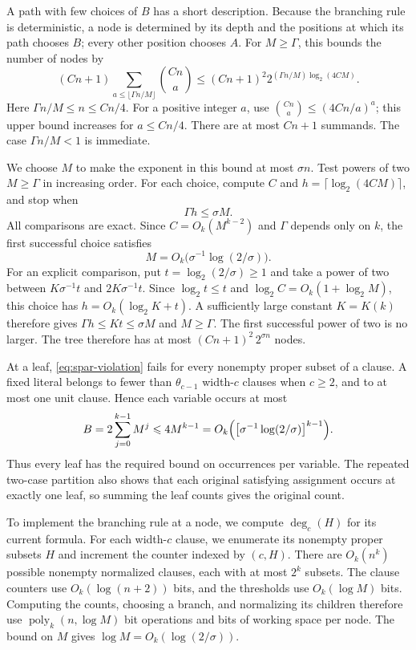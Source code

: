 \documentclass[11pt,reqno]{amsart}
\numberwithin{equation}{section}
\theoremstyle{definition}\newtheorem{definition}[theorem]{Definition}
\theoremstyle{remark}\newtheorem{remark}[theorem]{Remark}
\newcommand{\poly}{\operatorname{poly}}
\renewcommand{\le}{\leqslant}
\renewcommand{\ge}{\geqslant}
\begin{document}
A path with few choices of $B$ has a short description.
Because the branching rule is deterministic, a node is determined
by its depth and the positions at which its path chooses $B$;
every other position chooses $A$.
For $M\ge\Gamma$, this bounds the number of nodes by
\[
 (Cn+1)\sum_{a\le\lfloor\Gamma n/M\rfloor}\binom{Cn}{a}
 \le (Cn+1)^2
       2^{(\Gamma n/M)\log_2(4CM)}.
\]
Here $\Gamma n/M\le n\le Cn/4$.
For a positive integer $a$, use
$\binom{Cn}{a}\le(4Cn/a)^a$; this upper bound increases for
$a\le Cn/4$.
There are at most $Cn+1$ summands.
The case $\Gamma n/M<1$ is immediate.

We choose $M$ to make the exponent in this bound at most $\sigma n$.
Test powers of two $M\ge\Gamma$ in increasing order.
For each choice, compute $C$ and $h=\lceil\log_2(4CM)\rceil$,
and stop when
\[
 \Gamma h\le\sigma M.
\]
All comparisons are exact. Since $C=O_k(M^{k-2})$ and $\Gamma$
depends only on $k$, the first successful choice satisfies
\[
 M=O_k\bigl(\sigma^{-1}\log(2/\sigma)\bigr).
\]
For an explicit comparison, put $t=\log_2(2/\sigma)\ge1$ and
take a power of two between $K\sigma^{-1}t$ and
$2K\sigma^{-1}t$. Since $\log_2 t\le t$ and
$\log_2 C=O_k(1+\log_2 M)$, this choice has
$h=O_k(\log_2 K+t)$. A sufficiently large constant $K=K(k)$
therefore gives $\Gamma h\le Kt\le\sigma M$ and $M\ge\Gamma$.
The first successful power of two is no larger.
The tree therefore has at most $(Cn+1)^2\,2^{\sigma n}$ nodes.

At a leaf, \eqref{eq:spar-violation} fails for every nonempty proper
subset of a clause.
A fixed literal belongs to fewer than $\theta_{c-1}$ width-$c$
clauses when $c\ge2$, and to at most one unit clause. Hence each variable
occurs at most
\[
 B=2\sum_{j=0}^{k-1}M^j
   \le4M^{k-1}
   =O_k\Bigl(\bigl[\sigma^{-1}\log(2/\sigma)\bigr]^{k-1}\Bigr).
\]
Thus every leaf has the required bound on occurrences per variable.
The repeated two-case partition also shows that each original
satisfying assignment occurs at exactly one leaf, so summing the
leaf counts gives the original count.

To implement the branching rule at a node, we compute $\deg_c(H)$
for its current formula. For each width-$c$ clause, we enumerate
its nonempty proper subsets $H$ and increment the counter indexed
by $(c,H)$. There are $O_k(n^k)$ possible nonempty normalized clauses,
each with at most $2^k$ subsets. The clause counters use
$O_k(\log(n+2))$ bits, and the thresholds use $O_k(\log M)$ bits.
Computing the counts, choosing a branch, and normalizing its children
therefore use $\poly_k(n,\log M)$ bit operations and bits of working
space per node. The bound on $M$ gives
$\log M=O_k(\log(2/\sigma))$.
\end{document}
